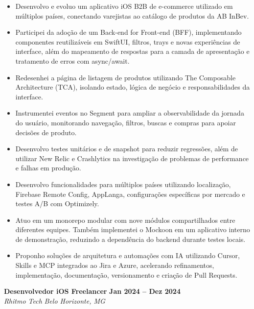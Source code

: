 \documentclass[10pt,a4paper]{article}
\newcommand{\job}[4]{%
  \textbf{#1} \hfill \textbf{#2}\\
  \textit{#3} \hfill \textit{#4}\\[-2pt]
}
\begin{document}
\begin{itemize}

\item Desenvolvo e evoluo um aplicativo iOS B2B de e-commerce utilizado em múltiplos países, conectando varejistas ao catálogo de produtos da AB InBev.

\item Participei da adoção de um Back-end for Front-end (BFF), implementando componentes reutilizáveis em SwiftUI, filtros, trays e novas experiências de interface, além do mapeamento de respostas para a camada de apresentação e tratamento de erros com async/await.

\item Redesenhei a página de listagem de produtos utilizando The Composable Architecture (TCA), isolando estado, lógica de negócio e responsabilidades da interface.

\item Instrumentei eventos no Segment para ampliar a observabilidade da jornada do usuário, monitorando navegação, filtros, buscas e compras para apoiar decisões de produto.

\item Desenvolvo testes unitários e de snapshot para reduzir regressões, além de utilizar New Relic e Crashlytics na investigação de problemas de performance e falhas em produção.

\item Desenvolvo funcionalidades para múltiplos países utilizando localização, Firebase Remote Config, AppLanga, configurações específicas por mercado e testes A/B com Optimizely.

\item Atuo em um monorepo modular com nove módulos compartilhados entre diferentes equipes. Também implementei o Mockoon em um aplicativo interno de demonstração, reduzindo a dependência do backend durante testes locais.

\item Proponho soluções de arquitetura e automações com IA utilizando Cursor, Skills e MCP integrados ao Jira e Azure, acelerando refinamentos, implementação, documentação, versionamento e criação de Pull Requests.

\end{itemize}

\job{Desenvolvedor iOS Freelancer}{Jan 2024 -- Dez 2024}{Rhitmo Tech}{Belo Horizonte, MG}
\end{document}
